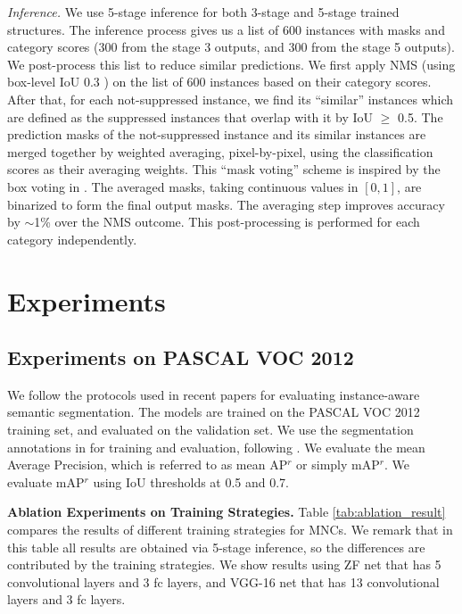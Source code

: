 \documentclass[10pt,twocolumn,letterpaper]{article}
\begin{document}
\vspace{.5em}
\noindent\emph{Inference.}
We use 5-stage inference for both 3-stage and 5-stage trained structures. The inference process gives us a list of 600 instances with masks and category scores (300 from the stage 3 outputs, and 300 from the stage 5 outputs).
We post-process this list to reduce similar predictions. We first apply NMS (using box-level IoU 0.3 \cite{Girshick2014}) on the list of 600 instances based on their category scores. After that, for each not-suppressed instance, we find its ``similar'' instances which are defined as the suppressed instances that overlap with it by IoU $\geq$ 0.5. The prediction masks of the not-suppressed instance and its similar instances are merged together by weighted averaging, pixel-by-pixel, using the classification scores as their averaging weights. This ``mask voting'' scheme is inspired by the box voting in \cite{Gidaris2015}.
The averaged masks, taking continuous values in $[0, 1]$, are binarized to form the final output masks. The averaging step improves accuracy by $\sim$1\% over the NMS outcome.
This post-processing is performed for each category independently.

\section{Experiments}

\subsection{Experiments on PASCAL VOC 2012}

We follow the protocols used in recent papers \cite{Hariharan2014,Dai2015,Hariharan2015} for evaluating instance-aware semantic segmentation. The models are trained on the PASCAL VOC 2012 training set, and evaluated on the validation set. We use the segmentation annotations in \cite{Hariharan2011} for training and evaluation, following \cite{Hariharan2014,Dai2015,Hariharan2015}.
We evaluate the mean Average Precision, which is referred to as mean AP$^r$ \cite{Hariharan2014} or simply mAP$^r$. We evaluate mAP$^r$ using IoU thresholds at 0.5 and 0.7.

\vspace{.5em}
\noindent\textbf{Ablation Experiments on Training Strategies.} Table \ref{tab:ablation_result} compares the results of different training strategies for MNCs. We remark that in this table all results are obtained via 5-stage inference, so the differences are contributed by the training strategies. We show results using ZF net \cite{Zeiler2014} that has 5 convolutional layers and 3 fc layers, and VGG-16 net \cite{Simonyan2015} that has 13 convolutional layers and 3 fc layers.
\end{document}

